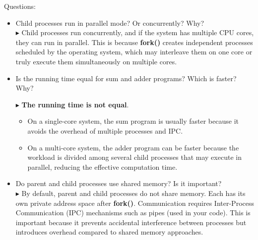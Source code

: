 \documentclass[12pt]{article}
\begin{document}
Questions:
\begin{itemize}
    \item Child processes run in parallel mode? Or concurrently? Why?\\
    \(\blacktriangleright\) Child processes run concurrently, and if the system has multiple CPU cores, they can run in parallel. This is because \textbf{fork()} creates independent processes scheduled by the operating system, which may interleave them on one core or truly execute them simultaneously on multiple cores.
    
    \item Is the running time equal for sum and adder programs? Which is faster? Why?

    \(\blacktriangleright\)
    \textbf{The running time is not equal}.
    \begin{itemize}
        \item On a single-core system, the sum program is usually faster because it avoids the overhead of multiple processes and IPC.
        \item On a multi-core system, the adder program can be faster because the workload is divided among several child processes that may execute in parallel, reducing the effective computation time.
    \end{itemize}
\item Do parent and child processes use shared memory? Is it
important?\\
\(\blacktriangleright\) By default, parent and child processes do not share memory. Each has its own private address space after \textbf{fork()}. Communication requires Inter-Process Communication (IPC) mechanisms such as pipes (used in your code). This is important because it prevents accidental interference between processes but introduces overhead compared to shared memory approaches.
\end{itemize}
\end{document}
